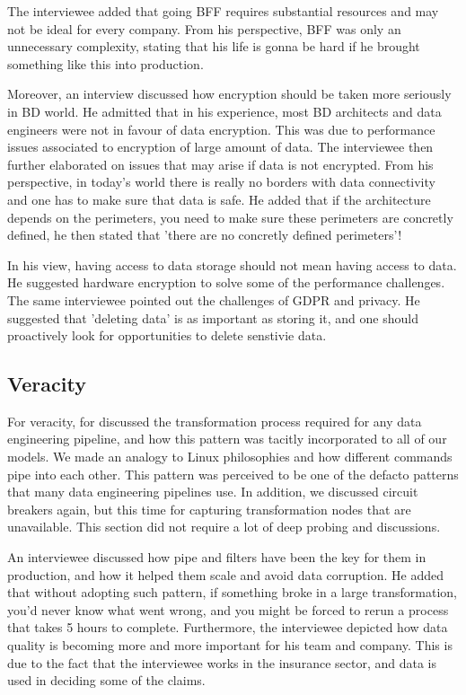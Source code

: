 \documentclass{bmcart}
\begin{document}
The interviewee added that going BFF requires substantial resources and may not be ideal for every company. From his perspective, BFF was only an unnecessary complexity, stating that his life is gonna be hard if he brought something like this into production.

Moreover, an interview discussed how encryption should be taken more seriously in BD world. He admitted that in his experience, most BD architects and data engineers were not in favour of data encryption. This was due to performance issues associated to encryption of large amount of data. The interviewee then further elaborated on issues that may arise if data is not encrypted. From his perspective, in today's world there is really no borders with data connectivity and one has to make sure that data is safe. He added that if the architecture depends on the perimeters, you need to make sure these perimeters are concretly defined, he then stated that 'there are no concretly defined perimeters'! 

In his view, having access to data storage should not mean having access to data. He suggested hardware encryption to solve some of the performance challenges. The same interviewee pointed out the challenges of GDPR and privacy. He suggested that 'deleting data' is as important as storing it, and one should proactively look for opportunities to delete senstivie data. 


\subsection{Veracity}

For veracity, for discussed the transformation process required for any data engineering pipeline, and how this pattern was tacitly incorporated to all of our models. We made an analogy to Linux philosophies and how different commands pipe into each other. This pattern was perceived to be one of the defacto patterns that many data engineering pipelines use. In addition, we discussed circuit breakers again, but this time for capturing transformation nodes that are unavailable. This section did not require a lot of deep probing and discussions. 


An interviewee discussed how pipe and filters have been the key for them in production, and how it helped them scale and avoid data corruption. He added that without adopting such pattern, if something broke in a large transformation, you'd never know what went wrong, and you might be forced to rerun a process that takes 5 hours to complete. Furthermore, the interviewee depicted how data quality is becoming more and more important for his team and company. This is due to the fact that the interviewee works in the insurance sector, and data is used in deciding some of the claims. 
\end{document}
